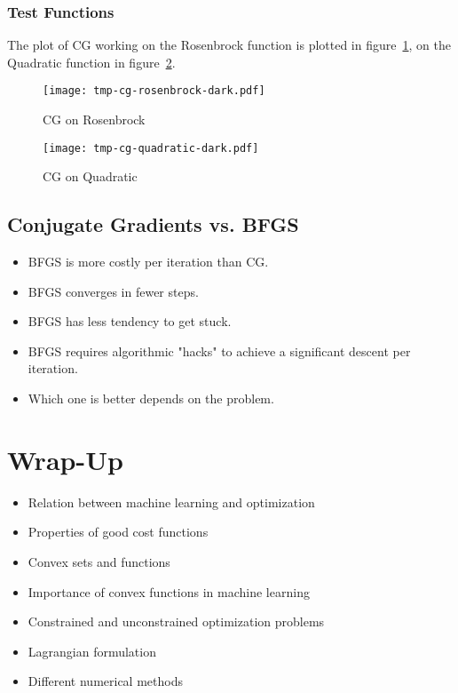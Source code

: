 			\subsubsection{Test Functions}
				The plot of CG working on the Rosenbrock function is plotted in figure~\ref{fig:cgExampleRosenbrock}, on the Quadratic function in figure~\ref{fig:cgExampleQuadratic}.

				\begin{figure} 
					\centering
					\texttt{[image: tmp-cg-rosenbrock-dark.pdf]}
					\caption{CG on Rosenbrock}
					\label{fig:cgExampleRosenbrock}
				\end{figure}
				\begin{figure}
					\centering
					\texttt{[image: tmp-cg-quadratic-dark.pdf]}
					\caption{CG on Quadratic}
					\label{fig:cgExampleQuadratic}
				\end{figure}

		\subsection{Conjugate Gradients vs. BFGS}
			\begin{itemize}
				\item BFGS is more costly per iteration than CG.
				\item BFGS converges in fewer steps.
				\item BFGS has less tendency to get stuck.
				\item BFGS requires algorithmic "hacks" to achieve a significant descent per iteration.
				\item Which one is better depends on the problem.
			\end{itemize}
	
	\section{Wrap-Up}
		\begin{itemize}
			\item Relation between machine learning and optimization
			\item Properties of good cost functions
			\item Convex sets and functions
			\item Importance of convex functions in machine learning
			\item Constrained and unconstrained optimization problems
			\item Lagrangian formulation
			\item Different numerical methods
		\end{itemize}

